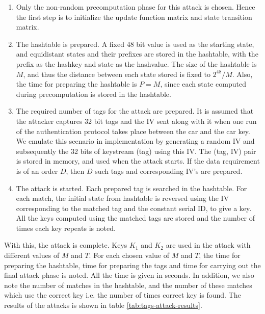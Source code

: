 \begin{enumerate}

\item Only the non-random precomputation phase for this attack is chosen. Hence the first step is to initialize the update function matrix and state transition matrix.
\item The hashtable is prepared. A fixed 48 bit value is used as the starting state, and equidistant states and their prefixes are stored in the hashtable, with the prefix as the hashkey and state as the hashvalue. The size of the hashtable is $M$, and thus the distance between each state stored is fixed to $2^{48}/M$. Also, the time for preparing the hashtable is $P = M$, since each state computed during precomputation is stored in the hashtable.  
\item The required number of tags for the attack are prepared. It is assumed that the attacker captures 32 bit tags and the IV sent along with it when one run of the authentication protocol takes place between the car and the car key. We emulate this scenario in implementation by generating a random IV and subsequently the 32 bits of keystream (tag) using this IV. The (tag, IV) pair is stored in memory, and used when the attack starts. If the data requirement is of an order $D$, then $D$ such tags and corresponding IV's are prepared. 
\item The attack is started. Each prepared tag is searched in the hashtable. For each match, the initial state from hashtable is reversed using the IV corresponding to the matched tag and the constant serial ID, to give a key. All the keys computed using the matched tags are stored and the number of times each key repeats is noted. 
\end{enumerate}

With this, the attack is complete. Keys $K_1$ and $K_2$ are used in the attack with different values of $M$ and $T$. For each chosen value of $M$ and $T$, the time for preparing the hashtable, time for preparing the tags and time for carrying out the final attack phase is noted. All the time is given in seconds. In addition, we also note the number of matches in the hashtable, and the number of these matches which use the correct key i.e. the number of times correct key is found. The results of the attacks is shown in table \ref{tab:tags-attack-results}.


